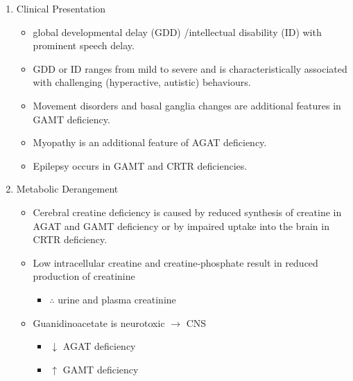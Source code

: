 \documentclass{scrartcl}
\begin{document}
\begin{enumerate}
\item Clinical Presentation
\label{sec:org4c18d6d}
\begin{itemize}
\item global developmental delay (GDD) /intellectual disability (ID) with
prominent speech delay.
\item GDD or ID ranges from mild to severe and is characteristically
associated with challenging (hyperactive, autistic) behaviours.
\item Movement disorders and basal ganglia changes are additional features
in GAMT deficiency.
\item Myopathy is an additional feature of AGAT deficiency.
\item Epilepsy occurs in GAMT and CRTR deficiencies.
\end{itemize}

\item Metabolic Derangement
\label{sec:org97a15a5}
\begin{itemize}
\item Cerebral  creatine  deficiency is  caused  by  reduced synthesis  of
creatine in AGAT and GAMT deficiency  or by impaired uptake into the
brain in CRTR deficiency.
\item Low intracellular creatine and creatine-phosphate result in reduced
production of creatinine
\begin{itemize}
\item \(\therefore\) \low urine and plasma creatinine
\end{itemize}
\item Guanidinoacetate is neurotoxic \(\to\) CNS
\begin{itemize}
\item \(\downarrow\) AGAT deficiency
\item \(\uparrow\) GAMT deficiency
\end{itemize}
\end{itemize}


\end{enumerate}
\end{document}
